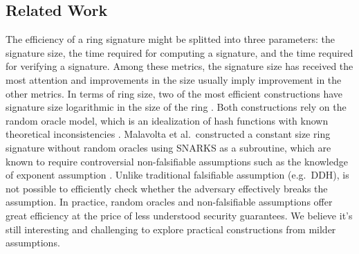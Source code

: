 \subsection{Related Work}
The efficiency of a ring signature might be splitted into three parameters: the signature size, the time required for computing a signature, and the time required for verifying a signature. Among these metrics, the signature size has received the most attention and improvements in the size usually imply improvement in the other metrics.
In terms of ring size, two of the most efficient constructions have signature size logarithmic in the size of the ring \cite{EC:GroKoh15,EC:LLNW16}. Both constructions rely on the {random oracle model}, which is an idealization of hash functions with known theoretical inconsistencies \cite{FOCS:GolKal03}. Malavolta et al.~constructed a constant size ring signature without random oracles \cite{AC:MalSch17} using SNARKS \cite{EC:GGPR13,AC:DFGK14,EC:Groth16} as a subroutine, which are known to require controversial non-falsifiable assumptions such as the knowledge of exponent assumption  \cite{STOC:GenWic11,C:Naor03}. Unlike traditional falsifiable assumption (e.g.~DDH), is not possible to efficiently check whether the adversary effectively breaks the assumption. In practice, random oracles and non-falsifiable assumptions offer great efficiency at the price of less understood security guarantees. We believe it's still interesting and challenging to explore practical constructions from milder assumptions.

